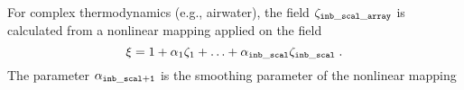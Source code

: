 For complex thermodynamics (e.g., airwater), the field $\zeta_\mathrm{\tt inb\_scal\_array}$ is calculated from a nonlinear mapping applied on the field
\begin{equation}
\xi =1+\alpha_1\zeta_1+\ldots+\alpha_\mathrm{\tt inb\_scal}\zeta_\mathrm{\tt inb\_scal}\;.
\end{equation}
The parameter $\alpha_\mathrm{\tt inb\_scal+1}$ is the smoothing parameter of the nonlinear mapping

